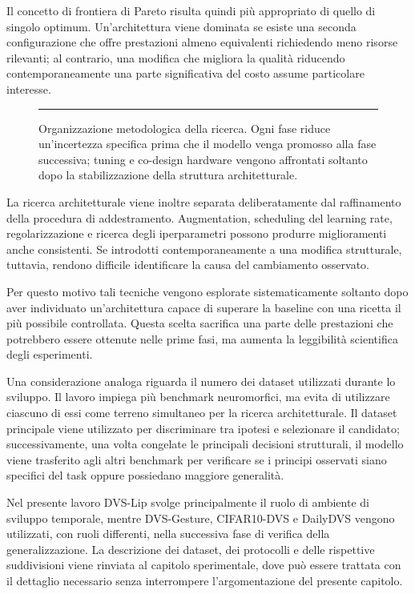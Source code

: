 Il concetto di frontiera di Pareto risulta quindi più appropriato di quello di singolo optimum. Un'architettura viene dominata se esiste una seconda configurazione che offre prestazioni almeno equivalenti richiedendo meno risorse rilevanti; al contrario, una modifica che migliora la qualità riducendo contemporaneamente una parte significativa del costo assume particolare interesse.

\begin{figure}[htbp]
    \centering
    \rule{0.9\textwidth}{5cm} %
    \caption{Organizzazione metodologica della ricerca. Ogni fase riduce un'incertezza specifica prima che il modello venga promosso alla fase successiva; tuning e co-design hardware vengono affrontati soltanto dopo la stabilizzazione della struttura architetturale.}
    \label{fig:workflow_metodologico_dettagliato}
\end{figure}

La ricerca architetturale viene inoltre separata deliberatamente dal raffinamento della procedura di addestramento. Augmentation, scheduling del learning rate, regolarizzazione e ricerca degli iperparametri possono produrre miglioramenti anche consistenti. Se introdotti contemporaneamente a una modifica strutturale, tuttavia, rendono difficile identificare la causa del cambiamento osservato.

Per questo motivo tali tecniche vengono esplorate sistematicamente soltanto dopo aver individuato un'architettura capace di superare la baseline con una ricetta il più possibile controllata. Questa scelta sacrifica una parte delle prestazioni che potrebbero essere ottenute nelle prime fasi, ma aumenta la leggibilità scientifica degli esperimenti.

Una considerazione analoga riguarda il numero dei dataset utilizzati durante lo sviluppo. Il lavoro impiega più benchmark neuromorfici, ma evita di utilizzare ciascuno di essi come terreno simultaneo per la ricerca architetturale. Il dataset principale viene utilizzato per discriminare tra ipotesi e selezionare il candidato; successivamente, una volta congelate le principali decisioni strutturali, il modello viene trasferito agli altri benchmark per verificare se i principi osservati siano specifici del task oppure possiedano maggiore generalità.

Nel presente lavoro DVS-Lip svolge principalmente il ruolo di ambiente di sviluppo temporale, mentre DVS-Gesture, CIFAR10-DVS e DailyDVS vengono utilizzati, con ruoli differenti, nella successiva fase di verifica della generalizzazione. La descrizione dei dataset, dei protocolli e delle rispettive suddivisioni viene rinviata al capitolo sperimentale, dove può essere trattata con il dettaglio necessario senza interrompere l'argomentazione del presente capitolo.

